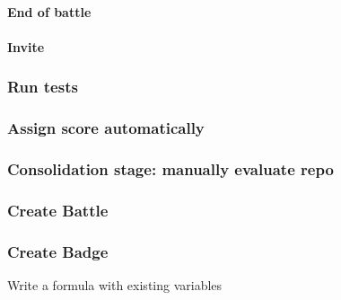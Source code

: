 \documentclass{article}
\begin{document}
                \paragraph*{End of battle}
                \paragraph*{Invite}
            \subsubsection{Run tests}
            \subsubsection{Assign score automatically}
            \subsubsection{Consolidation stage: manually evaluate repo}
            \subsubsection{Create Battle}
            \subsubsection{Create Badge}
                Write a formula with existing variables
\end{document}

